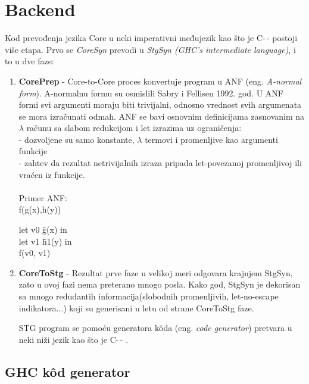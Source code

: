 \section{Backend}
\label{sec:backend}

Kod prevođenja jezika Core u neki imperativni međujezik kao što je C-\,- postoji više etapa.
Prvo se \textit{CoreSyn} prevodi u \textit{StgSyn (GHC’s intermediate language)}, i to u dve faze:
\begin{enumerate}
	\item \textbf{CorePrep} - Core-to-Core proces konvertuje program u ANF (eng. \emph{A-normal form}).\cite{GHCxy} A-normalnu formu su osmislili Sabry i Fellisen 1992. god.  U ANF formi svi argumenti moraju biti trivijalni, odnosno vrednost svih argumenata se mora izračunati odmah. ANF se bavi osnovnim definicijama zasnovanim na $\lambda$ računu sa slabom redukcijom i let izrazima uz ograničenja:\\
	- dozvoljene su samo konstante, $\lambda$ termovi i promenljive kao argumenti funkcije\\
	- zahtev da rezultat netrivijalnih izraza pripada let-povezanoj promenljivoj ili vraćen iz funkcije. \\ \\
	Primer ANF: \\ f(g(x),h(y))\\
	
	\begin{tabbing}
		let v0 \= g(x) in \\
		\>let v1 \= h1(y) in \\
		\> \> f(v0, v1)
	\end{tabbing}
	
	\item \textbf{CoreToStg} - Rezultat prve faze u velikoj meri odgovara krajnjem StgSyn, zato u ovoj fazi nema preterano mnogo posla. Kako god, StgSyn je dekorisan sa mnogo redudantih informacija(slobodnih promenljivih, let-no-escape indikatora...) koji su generisani u letu od strane CoreToStg faze.\cite{GHCxz}
	
	STG program se pomoću generatora k\^{o}da (eng. \emph{code generator}) pretvara u neki niži jezik kao što je C-\,- \cite{C--05}.
	
\end{enumerate}

\subsection{GHC k\^{o}d generator}
\label{sec:podnaslovGHCGenerator}

